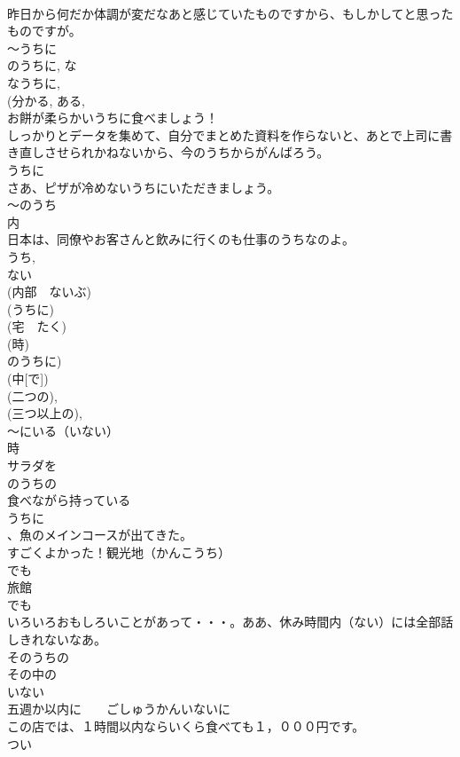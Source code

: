 \documentclass[8pt]{extreport}
\begin{document}
\begin{CJK}{UTF8}{min}
\\	昨日から何だか体調が変だなあと感じていたものですから、もしかしてと思ったものですが。
\\	～うちに
\\	のうちに, な
\\	なうちに, 
\\	(分かる, ある, 
\\	お餅が柔らかいうちに食べましょう！
\\	しっかりとデータを集めて、自分でまとめた資料を作らないと、あとで上司に書き直しさせられかねないから、今のうちからがんばろう。
\\	うちに
\\	さあ、ピザが冷めないうちにいただきましょう。
\\	～のうち
\\	内
\\	日本は、同僚やお客さんと飲みに行くのも仕事のうちなのよ。
\\	うち,
\\	ない
\\	(内部　ないぶ) 
\\	(うちに) 
\\	(宅　たく) 
\\	(時) 
\\	のうちに) 
\\	(中[で]) 
\\	(二つの), 
\\	(三つ以上の), 
\\	～にいる（いない）
\\	時
\\	サラダを
\\	のうちの
\\	食べながら持っている
\\	うちに
\\	、魚のメインコースが出てきた。
\\	すごくよかった！観光地（かんこうち）
\\	でも
\\	旅館
\\	でも
\\	いろいろおもしろいことがあって・・・。ああ、休み時間内（ない）には全部話しきれないなあ。
\\	そのうちの
\\	その中の
\\	いない
\\	五週か以内に　　ごしゅうかんいないに
\\	この店では、１時間以内ならいくら食べても１，０００円です。
\\	つい

\end{CJK}
\end{document}
